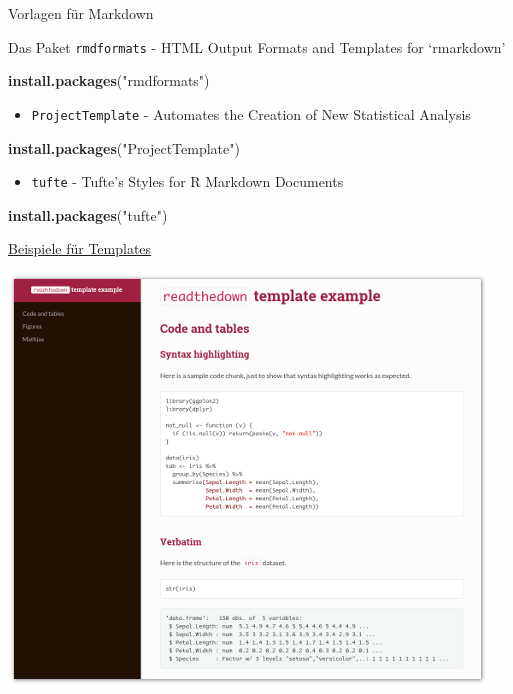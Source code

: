\documentclass[ignorenonframetext,]{beamer}
\newenvironment{Shaded}{}{}
\newcommand{\KeywordTok}[1]{\textcolor[rgb]{0.00,0.44,0.13}{\textbf{{#1}}}}
\newcommand{\StringTok}[1]{\textcolor[rgb]{0.25,0.44,0.63}{{#1}}}
\newcommand{\NormalTok}[1]{{#1}}
\providecommand{\tightlist}{%
\setlength{\itemsep}{0pt}\setlength{\parskip}{0pt}}
\begin{document}
\begin{frame}[fragile]{Vorlagen für Markdown}

Das Paket \texttt{rmdformats} - HTML Output Formats and Templates for
`rmarkdown'

\begin{Shaded}
\begin{Highlighting}[]
\KeywordTok{install.packages}\NormalTok{(}\StringTok{"rmdformats"}\NormalTok{)}
\end{Highlighting}
\end{Shaded}

\begin{itemize}
\tightlist
\item
  \texttt{ProjectTemplate} - Automates the Creation of New Statistical
  Analysis
\end{itemize}

\begin{Shaded}
\begin{Highlighting}[]
\KeywordTok{install.packages}\NormalTok{(}\StringTok{"ProjectTemplate"}\NormalTok{)}
\end{Highlighting}
\end{Shaded}

\begin{itemize}
\tightlist
\item
  \texttt{tufte} - Tufte's Styles for R Markdown Documents
\end{itemize}

\begin{Shaded}
\begin{Highlighting}[]
\KeywordTok{install.packages}\NormalTok{(}\StringTok{"tufte"}\NormalTok{)}
\end{Highlighting}
\end{Shaded}

\end{frame}

\begin{frame}{\href{https://github.com/juba/rmdformats}{Beispiele für
Templates}}

\includegraphics{./tex2pdf.956/073755cbbc10b721946300e9d9081f5d6077f3ce.png}

\end{frame}
\end{document}

